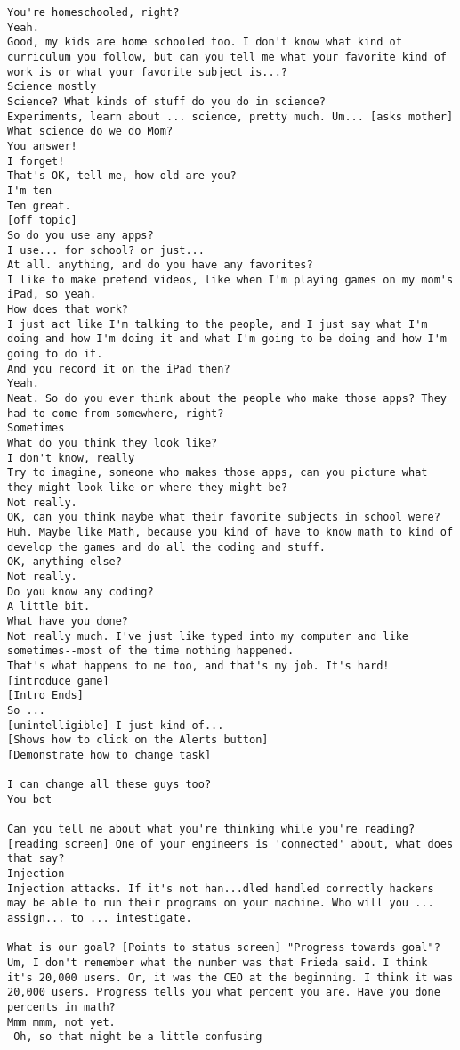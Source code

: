 \begin{lstlisting}
You're homeschooled, right?
Yeah.
Good, my kids are home schooled too. I don't know what kind of curriculum you follow, but can you tell me what your favorite kind of work is or what your favorite subject is...?
Science mostly
Science? What kinds of stuff do you do in science?
Experiments, learn about ... science, pretty much. Um... [asks mother] What science do we do Mom?
You answer!
I forget!
That's OK, tell me, how old are you?
I'm ten
Ten great. 
[off topic]
So do you use any apps?
I use... for school? or just...
At all. anything, and do you have any favorites?
I like to make pretend videos, like when I'm playing games on my mom's iPad, so yeah.
How does that work?
I just act like I'm talking to the people, and I just say what I'm doing and how I'm doing it and what I'm going to be doing and how I'm going to do it.
And you record it on the iPad then?
Yeah.
Neat. So do you ever think about the people who make those apps? They had to come from somewhere, right?
Sometimes
What do you think they look like?
I don't know, really
Try to imagine, someone who makes those apps, can you picture what they might look like or where they might be?
Not really.
OK, can you think maybe what their favorite subjects in school were?
Huh. Maybe like Math, because you kind of have to know math to kind of develop the games and do all the coding and stuff.
OK, anything else?
Not really.
Do you know any coding?
A little bit. 
What have you done?
Not really much. I've just like typed into my computer and like sometimes--most of the time nothing happened.
That's what happens to me too, and that's my job. It's hard!
[introduce game]
[Intro Ends]
So ...
[unintelligible] I just kind of...
[Shows how to click on the Alerts button]
[Demonstrate how to change task]

I can change all these guys too?
You bet

Can you tell me about what you're thinking while you're reading?
[reading screen] One of your engineers is 'connected' about, what does that say?
Injection
Injection attacks. If it's not han...dled handled correctly hackers may be able to run their programs on your machine. Who will you ... assign... to ... intestigate.

What is our goal? [Points to status screen] "Progress towards goal"?
Um, I don't remember what the number was that Frieda said. I think it's 20,000 users. Or, it was the CEO at the beginning. I think it was 20,000 users. Progress tells you what percent you are. Have you done percents in math?
Mmm mmm, not yet.
 Oh, so that might be a little confusing


\end{lstlisting}

